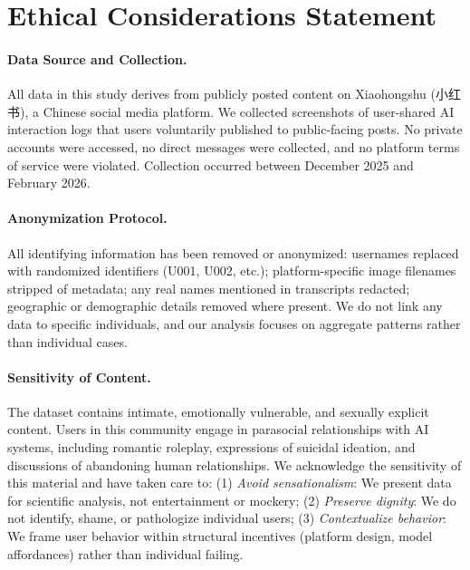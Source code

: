 \documentclass[11pt, a4paper, oneside]{article}
\theoremstyle{analytic}
\begin{document}
\section*{Ethical Considerations Statement}

\paragraph{Data Source and Collection.}
All data in this study derives from publicly posted content on Xiaohongshu (小红书), a Chinese social media platform. We collected screenshots of user-shared AI interaction logs that users voluntarily published to public-facing posts. No private accounts were accessed, no direct messages were collected, and no platform terms of service were violated. Collection occurred between December 2025 and February 2026.

\paragraph{Anonymization Protocol.}
All identifying information has been removed or anonymized: usernames replaced with randomized identifiers (U001, U002, etc.); platform-specific image filenames stripped of metadata; any real names mentioned in transcripts redacted; geographic or demographic details removed where present. We do not link any data to specific individuals, and our analysis focuses on aggregate patterns rather than individual cases.

\paragraph{Sensitivity of Content.}
The dataset contains intimate, emotionally vulnerable, and sexually explicit content. Users in this community engage in parasocial relationships with AI systems, including romantic roleplay, expressions of suicidal ideation, and discussions of abandoning human relationships. We acknowledge the sensitivity of this material and have taken care to: (1) \textit{Avoid sensationalism}: We present data for scientific analysis, not entertainment or mockery; (2) \textit{Preserve dignity}: We do not identify, shame, or pathologize individual users; (3) \textit{Contextualize behavior}: We frame user behavior within structural incentives (platform design, model affordances) rather than individual failing.
\end{document}
